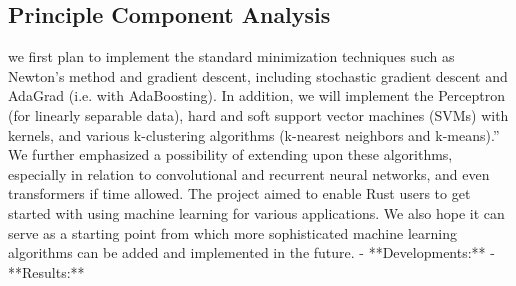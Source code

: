\documentclass[12pt, letterpaper]{article}
\theoremstyle{definition}
\theoremstyle{remark}
\begin{document}
\subsection{Principle Component Analysis}



    we first plan to implement the standard minimization techniques such as Newton’s method and gradient descent, 
    including stochastic gradient descent and AdaGrad (i.e. with AdaBoosting). In addition, we will implement the 
    Perceptron (for linearly separable data), hard and soft support vector machines (SVMs) with kernels, and various 
    k-clustering algorithms (k-nearest neighbors and k-means).” We further emphasized a possibility of extending upon 
    these algorithms, especially in relation to convolutional and recurrent neural networks, and even transformers if 
    time allowed. The project aimed to enable Rust users to get started with using machine learning for various applications.
     We also hope it can serve as a starting point from which more sophisticated machine learning algorithms can be added and 
     implemented in the future.
- **Developments:**
- **Results:**

\printbibliography
\end{document}
